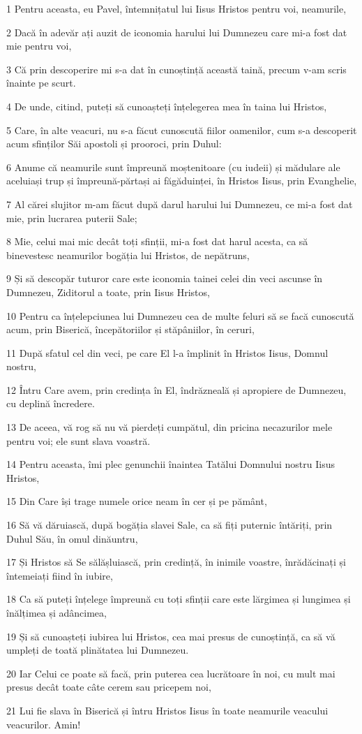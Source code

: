\par 1 Pentru aceasta, eu Pavel, întemnițatul lui Iisus Hristos pentru voi, neamurile,
\par 2 Dacă în adevăr ați auzit de iconomia harului lui Dumnezeu care mi-a fost dat mie pentru voi,
\par 3 Că prin descoperire mi s-a dat în cunoștință această taină, precum v-am scris înainte pe scurt.
\par 4 De unde, citind, puteți să cunoașteți înțelegerea mea în taina lui Hristos,
\par 5 Care, în alte veacuri, nu s-a făcut cunoscută fiilor oamenilor, cum s-a descoperit acum sfinților Săi apostoli și prooroci, prin Duhul:
\par 6 Anume că neamurile sunt împreună moștenitoare (cu iudeii) și mădulare ale aceluiași trup și împreună-părtași ai făgăduinței, în Hristos Iisus, prin Evanghelie,
\par 7 Al cărei slujitor m-am făcut după darul harului lui Dumnezeu, ce mi-a fost dat mie, prin lucrarea puterii Sale;
\par 8 Mie, celui mai mic decât toți sfinții, mi-a fost dat harul acesta, ca să binevestesc neamurilor bogăția lui Hristos, de nepătruns,
\par 9 Și să descopăr tuturor care este iconomia tainei celei din veci ascunse în Dumnezeu, Ziditorul a toate, prin Iisus Hristos,
\par 10 Pentru ca înțelepciunea lui Dumnezeu cea de multe feluri să se facă cunoscută acum, prin Biserică, începătoriilor și stăpâniilor, în ceruri,
\par 11 După sfatul cel din veci, pe care El l-a împlinit în Hristos Iisus, Domnul nostru,
\par 12 Întru Care avem, prin credința în El, îndrăzneală și apropiere de Dumnezeu, cu deplină încredere.
\par 13 De aceea, vă rog să nu vă pierdeți cumpătul, din pricina necazurilor mele pentru voi; ele sunt slava voastră.
\par 14 Pentru aceasta, îmi plec genunchii înaintea Tatălui Domnului nostru Iisus Hristos,
\par 15 Din Care își trage numele orice neam în cer și pe pământ,
\par 16 Să vă dăruiască, după bogăția slavei Sale, ca să fiți puternic întăriți, prin Duhul Său, în omul dinăuntru,
\par 17 Și Hristos să Se sălășluiască, prin credință, în inimile voastre, înrădăcinați și întemeiați fiind în iubire,
\par 18 Ca să puteți înțelege împreună cu toți sfinții care este lărgimea și lungimea și înălțimea și adâncimea,
\par 19 Și să cunoașteți iubirea lui Hristos, cea mai presus de cunoștință, ca să vă umpleți de toată plinătatea lui Dumnezeu.
\par 20 Iar Celui ce poate să facă, prin puterea cea lucrătoare în noi, cu mult mai presus decât toate câte cerem sau pricepem noi,
\par 21 Lui fie slava în Biserică și întru Hristos Iisus în toate neamurile veacului veacurilor. Amin!

